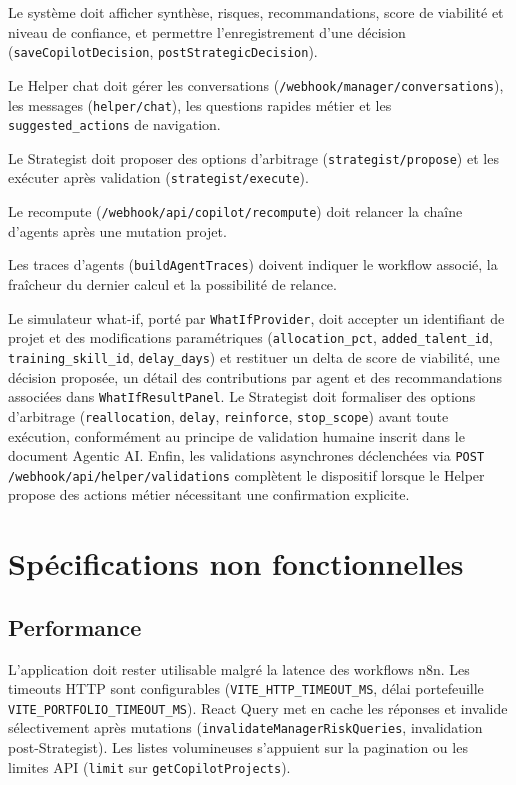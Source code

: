Le système doit afficher synthèse, risques, recommandations, score de viabilité et niveau de confiance, et permettre l'enregistrement d'une décision (\texttt{saveCopilotDecision}, \texttt{postStrategicDecision}).

Le Helper chat doit gérer les conversations (\texttt{/webhook/manager/conversations}), les messages (\texttt{helper/chat}), les questions rapides métier et les \texttt{suggested\_actions} de navigation.

Le Strategist doit proposer des options d'arbitrage (\texttt{strategist/propose}) et les exécuter après validation (\texttt{strategist/execute}).

Le recompute (\texttt{/webhook/api/copilot/recompute}) doit relancer la chaîne d'agents après une mutation projet.

Les traces d'agents (\texttt{buildAgentTraces}) doivent indiquer le workflow associé, la fraîcheur du dernier calcul et la possibilité de relance.

Le simulateur what-if, porté par \texttt{WhatIfProvider}, doit accepter un identifiant de projet et des modifications paramétriques (\texttt{allocation\_pct}, \texttt{added\_talent\_id}, \texttt{training\_skill\_id}, \texttt{delay\_days}) et restituer un delta de score de viabilité, une décision proposée, un détail des contributions par agent et des recommandations associées dans \texttt{WhatIfResultPanel}. Le Strategist doit formaliser des options d'arbitrage (\texttt{reallocation}, \texttt{delay}, \texttt{reinforce}, \texttt{stop\_scope}) avant toute exécution, conformément au principe de validation humaine inscrit dans le document Agentic AI. Enfin, les validations asynchrones déclenchées via \texttt{POST /webhook/api/helper/validations} complètent le dispositif lorsque le Helper propose des actions métier nécessitant une confirmation explicite.

\section{Spécifications non fonctionnelles}

\subsection{Performance}

L'application doit rester utilisable malgré la latence des workflows n8n. Les timeouts HTTP sont configurables (\texttt{VITE\_HTTP\_TIMEOUT\_MS}, délai portefeuille \texttt{VITE\_PORTFOLIO\_TIMEOUT\_MS}). React Query met en cache les réponses et invalide sélectivement après mutations (\texttt{invalidateManagerRiskQueries}, invalidation post-Strategist). Les listes volumineuses s'appuient sur la pagination ou les limites API (\texttt{limit} sur \texttt{getCopilotProjects}).

